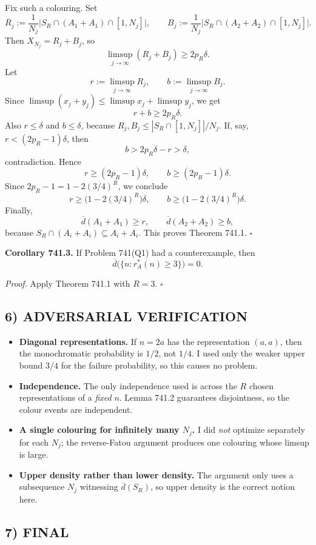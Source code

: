 Fix such a colouring. Set
\[
R_j:=\frac1{N_j}\bigl|S_R\cap(A_1+A_1)\cap[1,N_j]\bigr|,
\qquad
B_j:=\frac1{N_j}\bigl|S_R\cap(A_2+A_2)\cap[1,N_j]\bigr|.
\]
Then $X_{N_j}=R_j+B_j$, so
\[
\limsup_{j\to\infty}(R_j+B_j)\ge 2p_R\delta.
\]
Let
\[
r:=\limsup_{j\to\infty}R_j,\qquad b:=\limsup_{j\to\infty}B_j.
\]
Since $\limsup(x_j+y_j)\le \limsup x_j+\limsup y_j$, we get
\[
r+b\ge 2p_R\delta.
\]
Also $r\le \delta$ and $b\le \delta$, because $R_j,B_j\le |S_R\cap[1,N_j]|/N_j$.
If, say, $r<(2p_R-1)\delta$, then
\[
b>2p_R\delta-r>\delta,
\]
contradiction. Hence
\[
r\ge (2p_R-1)\delta,\qquad b\ge (2p_R-1)\delta.
\]
Since $2p_R-1=1-2(3/4)^R$, we conclude
\[
r\ge \bigl(1-2(3/4)^R\bigr)\delta,
\qquad
b\ge \bigl(1-2(3/4)^R\bigr)\delta.
\]
Finally,
\[
\overline d(A_1+A_1)\ge r,\qquad \overline d(A_2+A_2)\ge b,
\]
because $S_R\cap(A_i+A_i)\subseteq A_i+A_i$.
This proves Theorem 741.1. \hfill $\square$

\medskip
\noindent
\textbf{Corollary 741.3.}
If Problem 741(Q1) had a counterexample, then
\[
\overline d\bigl(\{n:r_A^{\ast}(n)\ge 3\}\bigr)=0.
\]

\medskip
\noindent
\emph{Proof.}
Apply Theorem 741.1 with $R=3$. \hfill $\square$

\subsection*{6) ADVERSARIAL VERIFICATION}

\begin{itemize}
\item \textbf{Diagonal representations.} If $n=2a$ has the representation $(a,a)$, then the monochromatic probability is $1/2$, not $1/4$. I used only the weaker upper bound $3/4$ for the failure probability, so this causes no problem.
\item \textbf{Independence.} The only independence used is across the $R$ chosen representations of a \emph{fixed} $n$. Lemma 741.2 guarantees disjointness, so the colour events are independent.
\item \textbf{A single colouring for infinitely many $N_j$.} I did \emph{not} optimize separately for each $N_j$; the reverse-Fatou argument produces one colouring whose limsup is large.
\item \textbf{Upper density rather than lower density.} The argument only uses a subsequence $N_j$ witnessing $\overline d(S_R)$, so upper density is the correct notion here.
\end{itemize}

\subsection*{7) FINAL}

